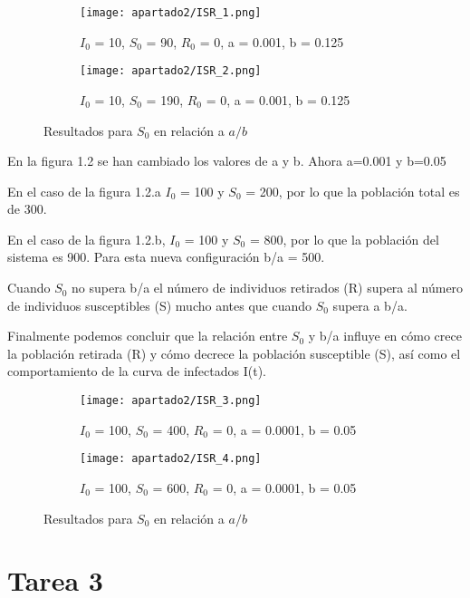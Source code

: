 \begin{figure}[H]
	\centering
	\begin{subfigure}[b]{0.8\textwidth}
		\centering
		\texttt{[image: apartado2/ISR\_1.png]}
		\caption{$I_0$ = 10, $S_0$ = 90, $R_0$ = 0, a = 0.001, b = 0.125}
	\end{subfigure}
	\hfill
	\begin{subfigure}[b]{0.8\textwidth}
		\centering
		\texttt{[image: apartado2/ISR\_2.png]}
		\caption{$I_0$ = 10, $S_0$ = 190, $R_0$ = 0, a = 0.001, b = 0.125}
	\end{subfigure}
	\caption{Resultados para $S_0$ en relación a $a/b$}
\end{figure}

\newpage

En la figura 1.2 se han cambiado los valores de a y b. Ahora a=0.001 y b=0.05

En el caso de la figura 1.2.a $I_0$ = 100 y $S_0$ = 200, por lo que la población total es de 300.

En el caso de la figura 1.2.b, $I_0$ = 100 y $S_0$ = 800, por lo que la población del sistema es 900. Para esta nueva configuración b/a = 500.

Cuando $S_0$ no supera b/a el número de individuos retirados (R) supera al número de individuos susceptibles (S) mucho antes que cuando $S_0$ supera a b/a.

Finalmente podemos concluir que la relación entre $S_0$ y b/a influye en cómo crece la población retirada (R) y cómo decrece la población susceptible (S), así como el comportamiento de la curva de infectados I(t).


\begin{figure}[H]
	\centering
	\begin{subfigure}[b]{0.8\textwidth}
		\centering
		\texttt{[image: apartado2/ISR\_3.png]}
		\caption{$I_0$ = 100, $S_0$ = 400, $R_0$ = 0, a = 0.0001, b = 0.05}
	\end{subfigure}
	\hfill
	\begin{subfigure}[b]{0.8\textwidth}
		\centering
		\texttt{[image: apartado2/ISR\_4.png]}
		\caption{$I_0$ = 100, $S_0$ = 600, $R_0$ = 0, a = 0.0001, b = 0.05}
	\end{subfigure}
	\caption{Resultados para $S_0$ en relación a $a/b$}
\end{figure}

\newpage

\section{Tarea 3}

